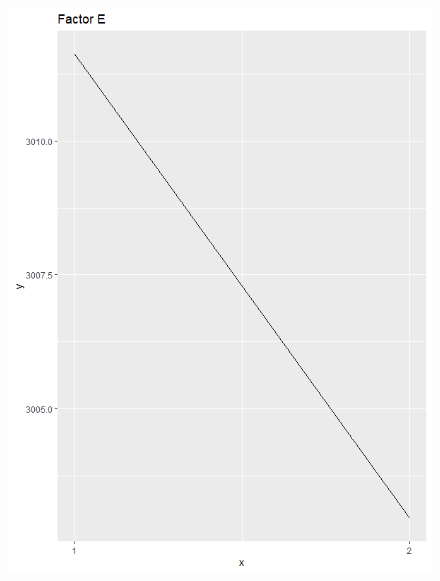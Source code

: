 \begin{figure}[H]
\begin{minipage}[b]{0.33\linewidth}
		\includegraphics[width=1\linewidth]{simulations/taguchi/plots/main_effect_e} 
	\end{minipage}%
	\begin{minipage}[b]{0.33\linewidth}
		\centering

\end{minipage}
\end{figure}
